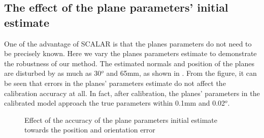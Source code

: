 \subsection{The effect of the plane parameters' initial estimate}
\label{sec:plane_params}
One of the advantage of SCALAR is that the planes parameters do not need to be precisely known. Here we vary the planes parameters estimate to demonstrate the robustness of our method. The estimated normals and position of the planes are disturbed by as much as 30$^o$ and 65mm, as shown in . From the figure, it can be seen that errors in the planes' parameters estimate do not affect the calibration accuracy at all. In fact, after calibration, the planes' parameters in the calibrated model approach the true parameters within 0.1mm and 0.02$^o$.


\begin{figure}[h]
  \centering
  \caption{Effect of the accuracy of the plane parameters initial estimate towards the position and orientation error} 
  \label{fig:plane_params}
\end{figure}



